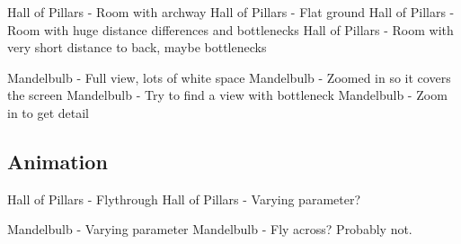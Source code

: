 Hall of Pillars - Room with archway
Hall of Pillars - Flat ground
Hall of Pillars - Room with huge distance differences and bottlenecks
Hall of Pillars - Room with very short distance to back, maybe bottlenecks

Mandelbulb - Full view, lots of white space
Mandelbulb - Zoomed in so it covers the screen
Mandelbulb - Try to find a view with bottleneck
Mandelbulb - Zoom in to get detail

\subsection{Animation}

Hall of Pillars - Flythrough
Hall of Pillars - Varying parameter?

Mandelbulb - Varying parameter
Mandelbulb - Fly across? Probably not.